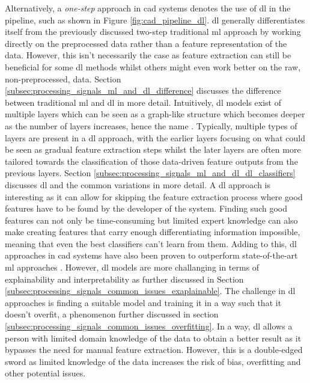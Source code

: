 Alternatively, a \textit{one-step} approach in \gls{cad} systems denotes the use of \gls{dl} in the pipeline, such as shown in Figure \ref{fig:cad_pipeline_dl}.
\gls{dl} generally differentiates itself from the previously discussed two-step traditional \gls{ml} approach by working directly on the preprocessed data rather than a feature representation of the data.
However, this isn't necessarily the case as feature extraction can still be beneficial for some \gls{dl} methods whilst others might even work better on the raw, non-preprocessed, data.
Section \ref{subsec:processing_signals_ml_and_dl_difference} discusses the difference between traditional \gls{ml} and \gls{dl} in more detail.
Intuitively, \gls{dl} models exist of multiple layers which can be seen as a graph-like structure which becomes deeper as the number of layers increases, hence the name .
Typically, multiple types of layers are present in a \gls{dl} approach, with the earlier layers focusing on what could be seen as gradual feature extraction steps whilst the later layers are often more tailored towards the classification of those data-driven feature outputs from the previous layers.
Section \ref{subsec:processing_signals_ml_and_dl_dl_classifiers} discusses \gls{dl} and the common variations in more detail.
A \gls{dl} approach is interesting as it can allow for skipping the feature extraction process where good features have to be found by the developer of the system.
Finding such good features can not only be time-consuming but limited expert knowledge can also make creating features that carry enough differentiating information impossible, meaning that even the best classifiers can't learn from them.
Adding to this, \gls{dl} approaches in \gls{cad} systems have also been proven to outperform state-of-the-art \gls{ml} approaches \citep{CAD_ml_dl_kbs}.
However, \gls{dl} models are more challanging in terms of explainability and interpretability as further discussed in Section \ref{subsec:processing_signals_common_issues_exaplainable}.
The challenge in \gls{dl} approaches is finding a suitable model and training it in a way such that it doesn't overfit, a phenomenon further discussed in section \ref{subsec:processing_signals_common_issues_overfitting}.
In a way, \gls{dl} allows a person with limited domain knowledge of the data to obtain a better result as it bypasses the need for manual feature extraction.
However, this is a double-edged sword as limited knowledge of the data increases the risk of bias, overfitting and other potential issues.

